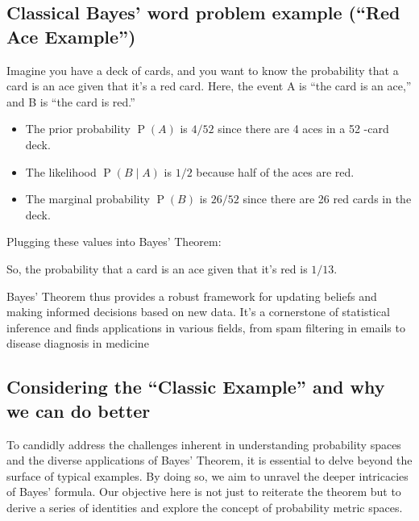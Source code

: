 \documentclass[
  12 pt,
  a4paper,
]{book}
\providecommand{\tightlist}{%
  \setlength{\itemsep}{0pt}\setlength{\parskip}{0pt}}
\numberwithin{equation}{section}
\theoremstyle{plain}      %
\theoremstyle{definition} %
\theoremstyle{remark}     %
\theoremstyle{note}         %
\begin{document}
\hypertarget{classical-bayes-word-problem-example-red-ace-example}{%
\subsection{Classical Bayes' word problem example (``Red Ace
Example'')}\label{classical-bayes-word-problem-example-red-ace-example}}

Imagine you have a deck of cards, and you want to know the probability
that a card is an ace given that it's a red card. Here, the event A is
``the card is an ace,'' and B is ``the card is red.''

\begin{itemize}
\tightlist
\item
  The prior probability \(\operatorname{P}(A)\) is \(4 / 52\) since
  there are 4 aces in a 52 -card deck.
\item
  The likelihood \(\operatorname{P}(B \mid A)\) is \(1 / 2\) because
  half of the aces are red.
\item
  The marginal probability \(\operatorname{P}(B)\) is \(26 / 52\) since
  there are 26 red cards in the deck.
\end{itemize}

Plugging these values into Bayes' Theorem:

So, the probability that a card is an ace given that it's red is
\(1 / 13\).

Bayes' Theorem thus provides a robust framework for updating beliefs and
making informed decisions based on new data. It's a cornerstone of
statistical inference and finds applications in various fields, from
spam filtering in emails to disease diagnosis in medicine

\hypertarget{considering-the-classic-example-and-why-we-can-do-better}{%
\subsection{Considering the ``Classic Example'' and why we can do
better}\label{considering-the-classic-example-and-why-we-can-do-better}}

To candidly address the challenges inherent in understanding probability
spaces and the diverse applications of Bayes' Theorem, it is essential
to delve beyond the surface of typical examples. By doing so, we aim to
unravel the deeper intricacies of Bayes' formula. Our objective here is
not just to reiterate the theorem but to derive a series of identities
and explore the concept of probability metric spaces.
\end{document}
